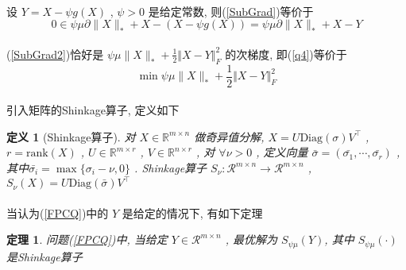 \documentclass[a4paper, UTF8]{ctexart}				%
\newtheorem{theo}{\bf 定理}[section]			  %
\newtheorem{define}{\bf 定义}[section]
\numberwithin{equation}{section}				%
\begin{document}
			\paragraph{}
				\quad 设 $Y = X - \psi g(X)$ , $\psi > 0$ 是给定常数, 则(\ref{SubGrad})等价于
				\begin{equation}\label{SubGrad2}
					0 \in \psi \mu \partial \lVert{X}\rVert_* + X - (X - \psi g(X)) = \psi \mu \partial \lVert{X}\rVert_* + X -Y
				\end{equation}

			\paragraph{}
				\quad (\ref{SubGrad2})恰好是 $\psi \mu \lVert{X}\rVert_* + \frac{1}{2} \Vert{X - Y}\Vert^2_F$ 的次梯度, 即(\ref{q4})等价于 
				\begin{equation}\label{FPCQ}
					\min \psi \mu \lVert{X}\rVert_* + \frac{1}{2} \Vert{X - Y}\Vert^2_F
				\end{equation}
			
			\paragraph{}
				\quad 引入矩阵的Shinkage算子, 定义如下

			\begin{define}[Shinkage算子]
				对 $X \in \mathbb{R}^{m \times n}$ 做奇异值分解, $X = U \text{Diag}(\sigma) V ^\top$ , $r = \text{rank}(X)$ , $U \in \mathbb{R}^{m \times r}$ , $V \in \mathbb{R}^{n \times r}$ , 对 $\forall \nu > 0$ , 定义向量 $\bar{\sigma} = (\bar{\sigma_1}, \cdots, \bar{\sigma_r})$ , 其中$\bar{\sigma_i} = \max \{\sigma_i - \nu, 0\}$ . Shinkage算子 $S_\nu: \mathcal{R}^{m \times n} \rightarrow \mathcal{R}^{m \times n}$ , $S_\nu(X) = U \text{Diag}(\bar{\sigma}) V ^\top$
			\end{define}

			\paragraph{}
				\quad 当认为(\ref{FPCQ})中的 $Y$ 是给定的情况下, 有如下定理
			\begin{theo}
				问题(\ref{FPCQ})中, 当给定 $Y \in \mathcal{R}^{m \times n}$ , 最优解为 $S_{\psi \mu}(Y)$, 其中 $S_{\psi \mu}(\cdot)$ 是Shinkage算子
			\end{theo}
			
\end{document}
